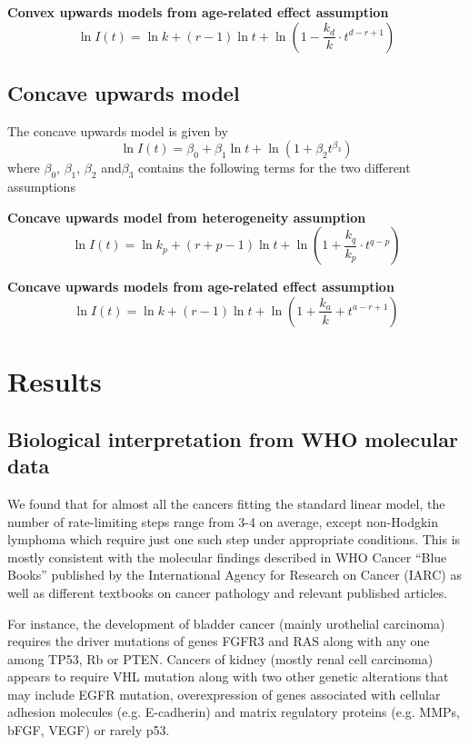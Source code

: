 \documentclass[lineno,sn-basic, Numbered]{sn-jnl}%
\theoremstyle{thmstyleone}%
\theoremstyle{thmstyletwo}%
\theoremstyle{thmstylethree}%
\begin{document}
\textbf{Convex upwards models from age-related effect assumption}
\begin{equation}
\ln I(t) = \ln k + (r - 1) \ln t + \ln \left( 1 - \frac{k_d}{k} \cdot t^{d-r+1} \right)
\end{equation}

\subsection*{Concave upwards model}

The concave upwards model is given by
\begin{equation}
\ln I(t) = \beta_0 + \beta_1 \ln t + \ln(1 + \beta_2 t^{\beta_3})
\end{equation}
where \( \beta_0 \), \( \beta_1 \), \( \beta_2 \) and\( \beta_3\) contains the following terms for the two different assumptions

\textbf{Concave upwards model from heterogeneity assumption}
\begin{equation}
\ln I(t) = \ln k_p + (r + p - 1) \ln t + \ln \left( 1 + \frac{k_q}{k_p} \cdot t^{q-p}\right)
\end{equation}

\textbf{Concave upwards models from age-related effect assumption}
\begin{equation}
\ln I(t) = \ln k + (r - 1) \ln t + \ln \left( 1 + \frac{k_a}{k} + t^{a-r+1} \right)
\end{equation}

\section{Results}\label{sec2}

\subsection{Biological interpretation from WHO molecular data}

We found that for almost all the cancers fitting the standard linear model, the number of rate-limiting steps range from 3-4 on average, except non-Hodgkin lymphoma which require just one such step under appropriate conditions. This is mostly consistent with the molecular findings described in WHO Cancer “Blue Books” published by the International Agency for Research on Cancer (IARC) as well as different textbooks on cancer pathology and relevant published articles. \cite{vogelstein2002genetic}

For instance, the development of bladder cancer (mainly urothelial carcinoma) requires the driver mutations of genes FGFR3 and RAS along with any one among TP53, Rb or PTEN. \cite{cazier2014wholegenome} Cancers of kidney (mostly renal cell carcinoma) appears to require VHL mutation along with two other genetic alterations that may include EGFR mutation, overexpression of genes associated with cellular adhesion molecules (e.g. E-cadherin) and matrix regulatory proteins (e.g. MMPs, bFGF, VEGF) or rarely p53.
\end{document}
